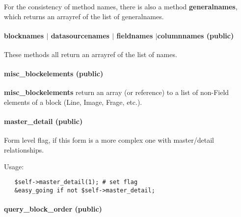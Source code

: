 For the consistency of method names, there is also a method \textbf{generalnames},
which returns an arrayref of the list of generalnames.

\paragraph*{blocknames $|$ datasourcenames $|$ fieldnames $|$columnnames (public)\label{Apiis::Form::Init_--_base_package_for_Form_objects_of_all_types_blocknames_datasourcenames_fieldnames_columnnames_public_}}


These methods all return an arrayref of the list of names.

\paragraph*{misc\_blockelements (public)\label{Apiis::Form::Init_--_base_package_for_Form_objects_of_all_types_misc_blockelements_public_}}


\textbf{misc\_blockelements} return an array (or reference) to a list of non-Field
elements of a block (Line, Image, Frage, etc.).

\paragraph*{master\_detail (public)\label{Apiis::Form::Init_--_base_package_for_Form_objects_of_all_types_master_detail_public_}}


Form level flag, if this form is a more complex one with master/detail
relationships.



Usage:

\begin{verbatim}
   $self->master_detail(1); # set flag
   &easy_going if not $self->master_detail;
\end{verbatim}
\paragraph*{query\_block\_order (public)\label{Apiis::Form::Init_--_base_package_for_Form_objects_of_all_types_query_block_order_public_}}


